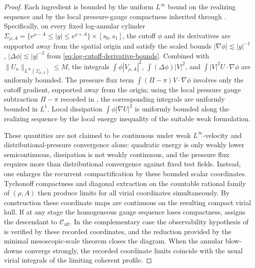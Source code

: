 \documentclass[11pt]{amsart}
\numberwithin{equation}{section}
\theoremstyle{plain}
\theoremstyle{definition}
\theoremstyle{remark}
\newcommand{\Caff}{\mathcal C_{\mathrm{aff}}}
\begin{document}
\begin{proof}
Each ingredient is bounded by the uniform \(L^\infty\) bound on the realizing
sequence and by the local pressure-gauge compactness inherited through
.  Specifically, on every fixed
log-annular cylinder
\(\Sigma_{\rho,A}=\{e^{\rho-A}\le|y|\le e^{\rho+A}\}\times[s_0,s_1]\),
the cutoff \(\phi\) and its derivatives are supported away from the spatial
origin and satisfy the scaled bounds
\(|\nabla\phi|\lesssim |y|^{-1}\), \(|\Delta\phi|\lesssim |y|^{-2}\) from
\eqref{eq:log-cutoff-derivative-bounds}.  Combined with
\(\|U_n\|_{L^\infty(\Sigma_{\rho,A})}\le M\), the integrals
\(\int\phi|V_{\rho,A}|^2\), \(\int(\Delta\phi)|V|^2\), and
\(\int|V|^2 U\cdot\nabla\phi\) are uniformly bounded.  The pressure flux term
\(\int(\Pi-\pi)V\cdot\nabla\phi\) involves only the cutoff gradient, supported
away from the origin; using the local pressure gauge subtraction
\(\Pi-\pi\) recorded in
,
the corresponding integrals are uniformly bounded in \(L^1\).  Local
dissipation \(\int\phi|\nabla U|^2\) is uniformly bounded along the realizing
sequence by the local energy inequality of the suitable weak formulation.

These quantities are not claimed to be continuous under weak
\(L^\infty\)-velocity and distributional-pressure convergence alone: quadratic
energy is only weakly lower semicontinuous, dissipation is not weakly
continuous, and the pressure flux requires more than distributional convergence
against fixed test fields.  Instead, one enlarges the recurrent compactification
by these bounded scalar coordinates.  Tychonoff compactness and diagonal
extraction on the countable rational family of \((\rho,A)\) then produce limits
for all virial coordinates simultaneously.  By construction these coordinate
maps are continuous on the resulting compact virial hull.  If at any stage the
homogeneous gauge sequence loses compactness,
 assigns the descendant to \(\Caff\).
In the complementary case the observability hypothesis of
 is verified by these recorded
coordinates, and the reduction provided by the minimal mesoscopic-scale theorem
 closes the diagram.  When the annular
blow-downs converge strongly, the recorded coordinate limits coincide with the
usual virial integrals of the limiting coherent profile.
\end{proof}
\end{document}
